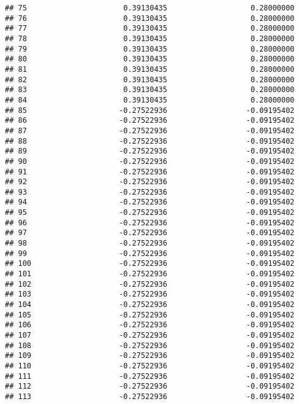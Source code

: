 \documentclass[]{article}
\begin{document}
\begin{verbatim}
## 75                      0.39130435                   0.28000000
## 76                      0.39130435                   0.28000000
## 77                      0.39130435                   0.28000000
## 78                      0.39130435                   0.28000000
## 79                      0.39130435                   0.28000000
## 80                      0.39130435                   0.28000000
## 81                      0.39130435                   0.28000000
## 82                      0.39130435                   0.28000000
## 83                      0.39130435                   0.28000000
## 84                      0.39130435                   0.28000000
## 85                     -0.27522936                  -0.09195402
## 86                     -0.27522936                  -0.09195402
## 87                     -0.27522936                  -0.09195402
## 88                     -0.27522936                  -0.09195402
## 89                     -0.27522936                  -0.09195402
## 90                     -0.27522936                  -0.09195402
## 91                     -0.27522936                  -0.09195402
## 92                     -0.27522936                  -0.09195402
## 93                     -0.27522936                  -0.09195402
## 94                     -0.27522936                  -0.09195402
## 95                     -0.27522936                  -0.09195402
## 96                     -0.27522936                  -0.09195402
## 97                     -0.27522936                  -0.09195402
## 98                     -0.27522936                  -0.09195402
## 99                     -0.27522936                  -0.09195402
## 100                    -0.27522936                  -0.09195402
## 101                    -0.27522936                  -0.09195402
## 102                    -0.27522936                  -0.09195402
## 103                    -0.27522936                  -0.09195402
## 104                    -0.27522936                  -0.09195402
## 105                    -0.27522936                  -0.09195402
## 106                    -0.27522936                  -0.09195402
## 107                    -0.27522936                  -0.09195402
## 108                    -0.27522936                  -0.09195402
## 109                    -0.27522936                  -0.09195402
## 110                    -0.27522936                  -0.09195402
## 111                    -0.27522936                  -0.09195402
## 112                    -0.27522936                  -0.09195402
## 113                    -0.27522936                  -0.09195402

\end{verbatim}
\end{document}
